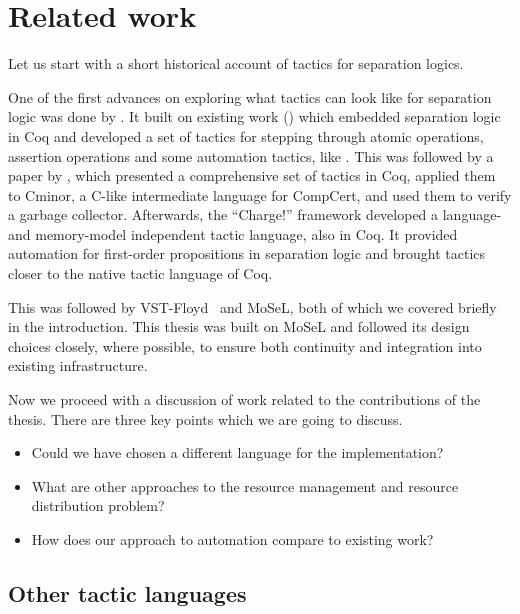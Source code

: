 \chapter{Related work}
\label{cha:related-work}

Let us start with a short historical account of tactics for separation logics.

One of the first advances on exploring what tactics can look like for separation logic was done by \citet{appel2006tactics}.
It built on existing work (\cite{marti05jssst}) which embedded separation logic in Coq and developed a set of tactics for stepping through atomic operations, assertion operations and some automation tactics, like .
This was followed by a paper by \citet{mccreightPracticalTacticsSeparation2009},
which presented a comprehensive set of tactics in Coq, applied them to Cminor, a C-like intermediate language for CompCert, and used them to verify a garbage collector.
Afterwards, the ``Charge!'' framework \cite{bengtsonCharge2012} developed a language- and memory-model independent tactic language, also in Coq.
It provided automation for first-order propositions in separation logic and brought tactics closer to the native tactic language of Coq.

This was followed by VST-Floyd~\cite{caoVSTFloydSeparationLogic2018} and MoSeL\cite{krebbersInteractiveProofsHigherorder2017, krebbersMoSeLGeneralExtensible2018}, both of which we covered briefly in the introduction.
This thesis was built on MoSeL and followed its design choices closely, where possible, to ensure both continuity and integration into existing infrastructure.

Now we proceed with a discussion of work related to the contributions of the thesis.
There are three key points which we are going to discuss.
\begin{itemize}
\item Could we have chosen a different language for the implementation?
\item What are other approaches to the resource management and resource distribution problem?
\item How does our approach to automation compare to existing work?
\end{itemize}

\pagebreak

\section{Other tactic languages}
\label{sec:other-tact-lang}


